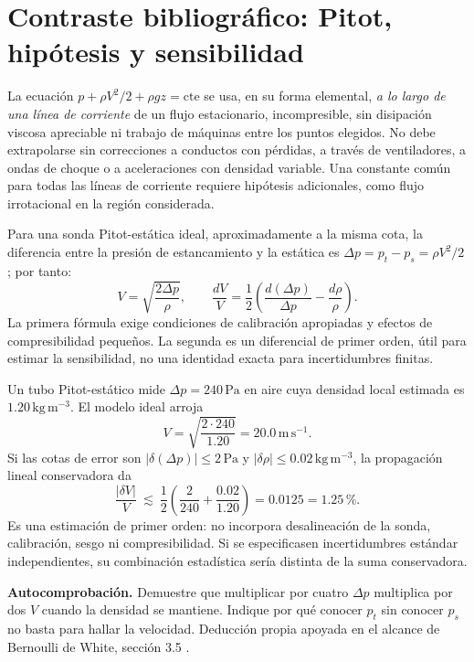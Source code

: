 
\section{Contraste bibliográfico: Pitot, hipótesis y sensibilidad}
\label{sec:ref26-pitot}

La ecuación \(p+\rho V^2/2+\rho gz=\mathrm{cte}\) se usa, en su forma elemental, \emph{a lo largo de una línea de corriente} de un flujo estacionario, incompresible, sin disipación viscosa apreciable ni trabajo de máquinas entre los puntos elegidos. No debe extrapolarse sin correcciones a conductos con pérdidas, a través de ventiladores, a ondas de choque o a aceleraciones con densidad variable. Una constante común para todas las líneas de corriente requiere hipótesis adicionales, como flujo irrotacional en la región considerada.

Para una sonda Pitot-estática ideal, aproximadamente a la misma cota, la diferencia entre la presión de estancamiento y la estática es \(\Delta p=p_t-p_s=\rho V^2/2\); por tanto:
\begin{equation}
 V=\sqrt{\frac{2\Delta p}{\rho}},\qquad
 \frac{dV}{V}=\frac12\left(\frac{d(\Delta p)}{\Delta p}-\frac{d\rho}{\rho}\right).
 \label{eq:ref26-pitot}
\end{equation}
La primera fórmula exige condiciones de calibración apropiadas y efectos de compresibilidad pequeños. La segunda es un diferencial de primer orden, útil para estimar la sensibilidad, no una identidad exacta para incertidumbres finitas.

\begin{tcolorbox}[title={Ejemplo guiado original: velocidad e incertidumbre}, studiumdef, breakable]
Un tubo Pitot-estático mide \(\Delta p=240\,\mathrm{Pa}\) en aire cuya densidad local estimada es \(1.20\,\mathrm{kg\,m^{-3}}\). El modelo ideal arroja
\[
 V=\sqrt{\frac{2\cdot240}{1.20}}=\mathbf{20.0\,\mathrm{m\,s^{-1}}}.
\]
Si las cotas de error son \(|\delta(\Delta p)|\leq2\,\mathrm{Pa}\) y \(|\delta\rho|\leq0.02\,\mathrm{kg\,m^{-3}}\), la propagación lineal conservadora da
\[
 \frac{|\delta V|}{V}\ \lesssim\
 \frac12\left(\frac{2}{240}+\frac{0.02}{1.20}\right)
 =0.0125=1.25\,\%.
\]
Es una estimación de primer orden: no incorpora desalineación de la sonda, calibración, sesgo ni compresibilidad. Si se especificasen incertidumbres estándar independientes, su combinación estadística sería distinta de la suma conservadora.
\end{tcolorbox}

\textbf{Autocomprobación.} Demuestre que multiplicar por cuatro \(\Delta p\) multiplica por dos \(V\) cuando la densidad se mantiene. Indique por qué conocer \(p_t\) sin conocer \(p_s\) no basta para hallar la velocidad. Deducción propia apoyada en el alcance de Bernoulli de White, sección 3.5 \cite{ref26-white}.

